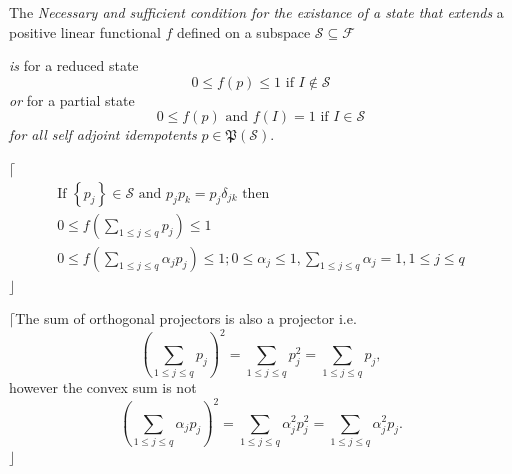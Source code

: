 \documentclass[aps,preprint]{revtex4}%
\begin{document}
The \emph{Necessary and sufficient condition for the existance of a state that
extends }a positive linear functional $f$ defined on a subspace
$\mathcal{S\subseteq F}$

\emph{is }for a reduced state\emph{ }%
\begin{equation}
0\leq f\left(  p\right)  \leq1\text{ if }I\notin\mathcal{S}%
\end{equation}
\emph{or }for a partial state\emph{ }%
\begin{equation}
0\leq f\left(  p\right)  \text{ and }f\left(  I\right)  =1\text{ if }%
I\in\mathcal{S}%
\end{equation}
\emph{for all self adjoint idempotents }$p\in$\emph{$\mathfrak{P}\left(
\mathcal{S}\right)  \mathfrak{.}$}

$\lceil$%
\begin{gather}
\text{If }\left\{  p_{j}\right\}  \in\mathcal{S}\text{ and }p_{j}p_{k}%
=p_{j}\delta_{jk}\text{ then }\\
0\leq f\left(
{\textstyle\sum\limits_{1\leq j\leq q}}
p_{j}\right)  \leq1\\
0\leq f\left(
{\textstyle\sum\limits_{1\leq j\leq q}}
\alpha_{j}p_{j}\right)  \leq1;0\leq\alpha_{j}\leq1,%
{\textstyle\sum\limits_{1\leq j\leq q}}
\alpha_{j}=1,1\leq j\leq q
\end{gather}
$\rfloor$

$\lceil$The sum of orthogonal projectors is also a projector i.e.
\begin{equation}
\left(
{\textstyle\sum\limits_{1\leq j\leq q}}
p_{j}\right)  ^{2}=%
{\textstyle\sum\limits_{1\leq j\leq q}}
p_{j}^{2}=%
{\textstyle\sum\limits_{1\leq j\leq q}}
p_{j},
\end{equation}
however the convex sum is not%
\begin{equation}
\left(
{\textstyle\sum\limits_{1\leq j\leq q}}
\alpha_{j}p_{j}\right)  ^{2}=%
{\textstyle\sum\limits_{1\leq j\leq q}}
\alpha_{j}^{2}p_{j}^{2}=%
{\textstyle\sum\limits_{1\leq j\leq q}}
\alpha_{j}^{2}p_{j}.
\end{equation}
$\rfloor$
\end{document}
